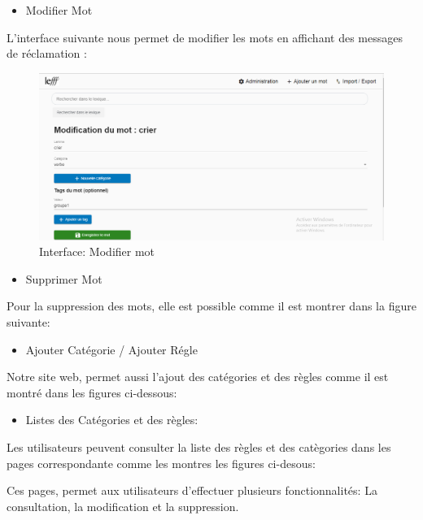 \documentclass[12pt,a4paper]{article}
\begin{document}
\begin{itemize}  
  \item Modifier Mot
\end{itemize}
L'interface suivante nous permet de modifier les mots en affichant des messages de réclamation : 

\begin{figure}[h]
\centering
\includegraphics[width=150mm]{img/ModificationMot.PNG}
\caption{Interface: Modifier mot}
\label{Tux}
\end{figure}


\begin{itemize}  
  \item Supprimer Mot
\end{itemize}
Pour la suppression des mots, elle est possible comme il est montrer dans la figure suivante:


\begin{itemize}  
  \item Ajouter Catégorie / Ajouter Régle 
\end{itemize}

Notre site web, permet aussi l'ajout des catégories et des règles comme il est montré dans les figures ci-dessous: 



\begin{itemize}  
  \item Listes des Catégories et des règles:
\end{itemize}
Les utilisateurs peuvent consulter la liste des règles et des catègories dans les pages correspondante comme les montres les figures ci-desous: 



Ces pages, permet aux utilisateurs  d'effectuer plusieurs fonctionnalités: La consultation, la modification et la suppression.
\end{document}
